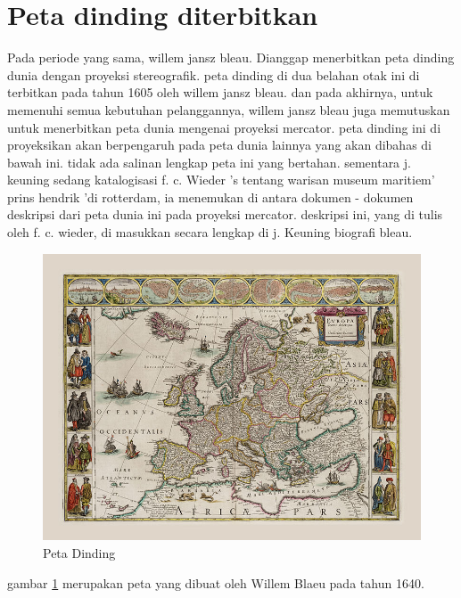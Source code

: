 \section{Peta dinding diterbitkan}
Pada periode yang sama, willem jansz bleau. Dianggap menerbitkan peta dinding dunia dengan proyeksi stereografik. 
peta dinding di dua belahan otak ini di terbitkan pada tahun 1605 oleh willem jansz bleau. dan pada akhirnya, untuk memenuhi semua kebutuhan pelanggannya, willem jansz bleau juga memutuskan untuk menerbitkan peta dunia mengenai proyeksi mercator. 
peta dinding ini di proyeksikan akan berpengaruh pada peta dunia lainnya yang akan dibahas di bawah ini. tidak ada salinan lengkap peta ini yang bertahan. sementara j. keuning sedang katalogisasi f. c. Wieder 's tentang warisan museum maritiem' 
prins hendrik 'di rotterdam, ia menemukan di antara dokumen - dokumen deskripsi dari peta dunia ini pada proyeksi mercator. 
deskripsi ini, yang di tulis oleh f. c. wieder, di masukkan secara lengkap di j. Keuning biografi bleau. 



\begin{figure}[ht]

\centerline{\includegraphics[width=1\textwidth]{figures/petadinding.jpg}}

\caption{Peta Dinding}

\label{petadinding}

\end{figure}

gambar \ref{petadinding} merupakan peta yang dibuat oleh Willem Blaeu pada tahun 1640.
 

